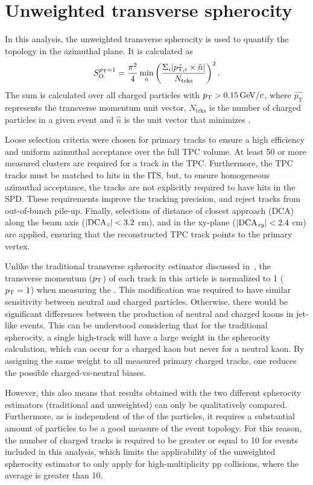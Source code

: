 \section{Unweighted transverse spherocity \SOPT}
\label{Sec:SOPT}

In this analysis, the unweighted transverse spherocity \SOPT is used to
quantify the topology in the azimuthal plane. It is calculated as
\begin{equation}\label{Eq:SOPT}
\centering
    \SOPT = \frac{\pi^2}{4} \min_{\hat{n}} \left(\frac{\Sigma_i
      |\hat{p_{\textrm{T},i}} \times \hat{n}|}{N_{\textrm{trks}}}  \right)^{2}.
\end{equation}
The sum is calculated over all charged particles with $p_{\rm T} > 0.15 \text{\,GeV/$c$}$, where $\hat{p_{\textrm{T}}}$ represents the transverse momentum unit vector, $N_{\textrm{trks}}$ is the number of charged particles in a given event and $\hat{n}$ is the unit vector that minimizes \SOPT. 

Loose selection criteria were chosen for primary tracks to ensure a high efficiency and uniform azimuthal acceptance over the full TPC volume. At least 50 or more measured clusters are required for a track in the TPC. Furthermore, the TPC tracks must be matched to hits in the ITS, but, to ensure homogeneous azimuthal acceptance, the tracks are not explicitly required to have hits in the SPD. These requirements improve the tracking precision, and reject tracks from out-of-bunch pile-up. Finally, selections of distance of closest approach (DCA) along the beam axis ($|\rm DCA_{\it{z}}|<3.2 $ cm), and in the xy-plane ($|\rm DCA_{\it{xy}}|<2.4 $ cm) are applied, ensuring that the reconstructed TPC track points to the primary vertex.

Unlike the traditional transverse spherocity estimator discussed in~\cite{ALICE:2019dfi}, the transverse momentum ($p_{\rm T}$) of each track in this article is normalized to 1 ($p_{\rm T} = 1$) when measuring the \SOPT. This modification was required to have similar sensitivity between neutral and charged particles. Otherwise, there would be significant differences between the production of neutral and charged kaons in jet-like events. This can be understood considering that for the traditional spherocity, a single high-\pt track will have a large weight in the spherocity calculation, which can occur for a charged kaon but never for a neutral kaon. By assigning the same weight to all measured primary charged tracks, one reduces the possible charged-vs-neutral biases.

However, this also means that results obtained with the two different spherocity estimators (traditional and unweighted) can only be qualitatively compared. Furthermore, as \SOPT is independent of the \pt of the particles, it requires a substantial amount of particles to be a good measure of the event topology. For this reason, the number of charged tracks is required to be greater or equal to 10 for events included in this analysis, which limits the applicability of the unweighted spherocity estimator to only apply for high-multiplicity pp collisions, where the average \dndeta is greater than 10.

